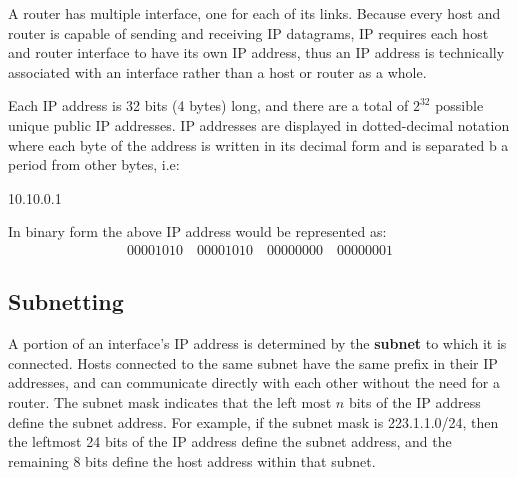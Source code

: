 \documentclass[12pt letter]{report}
\begin{document}

A router has multiple interface, one for each of its links. Because
every host and router is capable of sending and receiving  IP
datagrams, IP requires each host and router interface to have its own
IP address, thus an IP address is technically associated with an
interface rather than a host or router as a whole.

Each IP address is 32 bits (4 bytes) long, and there are a total of
$2^{32}$ possible unique public IP addresses. IP addresses are
displayed in dotted-decimal notation where each byte of the address
is written in its decimal form and is separated b a period from other
bytes, i.e:
\begin{center}
  10.10.0.1
\end{center}
In binary form the above IP address would be represented as:
\begin{align*}
  00001010 \quad 00001010 \quad 00000000 \quad 00000001
\end{align*}

\subsection{Subnetting}



A portion of an interface's IP address is determined by the
\textbf{subnet} to which it is connected. Hosts connected to the same
subnet have the same prefix in their IP addresses, and can
communicate directly with each other without the need for a router.
The subnet mask indicates that the left most $n$ bits of the IP
address define the subnet address. For example, if the subnet mask is
223.1.1.0/24, then the leftmost 24 bits of the IP address define the
subnet address, and the remaining 8 bits define the host address
within that subnet.
\end{document}
